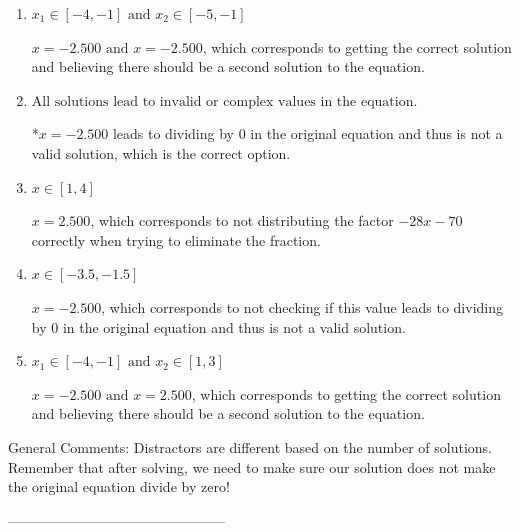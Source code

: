 \documentclass{article}[14pt]
\begin{document}
\begin{enumerate}[label=\Alph*.] 
\item $ x_1 \in [-4, -1] \text{ and } x_2 \in [-5,-1] $ 

 $x = -2.500 \text{ and } x = -2.500$, which corresponds to getting the correct solution and believing there should be a second solution to the equation. 
\item $ \text{All solutions lead to invalid or complex values in the equation.} $ 

 *$x = -2.500$ leads to dividing by 0 in the original equation and thus is not a valid solution, which is the correct option. 
\item $ x \in [1,4] $ 

 $x = 2.500$, which corresponds to not distributing the factor $-28x -70$ correctly when trying to eliminate the fraction. 
\item $ x \in [-3.5,-1.5] $ 

 $x = -2.500$, which corresponds to not checking if this value leads to dividing by 0 in the original equation and thus is not a valid solution. 
\item $ x_1 \in [-4, -1] \text{ and } x_2 \in [1,3] $ 

 $x = -2.500 \text{ and } x = 2.500$, which corresponds to getting the correct solution and believing there should be a second solution to the equation. 
\end{enumerate} 
 
General Comments: Distractors are different based on the number of solutions. Remember that after solving, we need to make sure our solution does not make the original equation divide by zero!

-----------------------------------------------
\end{document}

